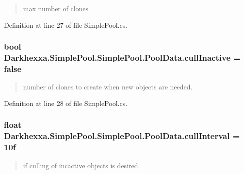 \begin{quotation}
max number of clones \end{quotation}




Definition at line 27 of file Simple\-Pool.\-cs.

\hypertarget{class_darkhexxa_1_1_simple_pool_1_1_simple_pool_1_1_pool_data_a19c48ea469a33d4188a996482939d665}{
\subsubsection[{cull\-Inactive}]{\setlength{\rightskip}{0pt plus 5cm}bool Darkhexxa.\-Simple\-Pool.\-Simple\-Pool.\-Pool\-Data.\-cull\-Inactive = false}}\label{class_darkhexxa_1_1_simple_pool_1_1_simple_pool_1_1_pool_data_a19c48ea469a33d4188a996482939d665}


\begin{quotation}
number of clones to create when new objects are needed. \end{quotation}




Definition at line 28 of file Simple\-Pool.\-cs.

\hypertarget{class_darkhexxa_1_1_simple_pool_1_1_simple_pool_1_1_pool_data_abf0fe104db5c39105f7c88dca1581bc1}{
\subsubsection[{cull\-Interval}]{\setlength{\rightskip}{0pt plus 5cm}float Darkhexxa.\-Simple\-Pool.\-Simple\-Pool.\-Pool\-Data.\-cull\-Interval = 10f}}\label{class_darkhexxa_1_1_simple_pool_1_1_simple_pool_1_1_pool_data_abf0fe104db5c39105f7c88dca1581bc1}


\begin{quotation}
if culling of incactive objects is desired. \end{quotation}




